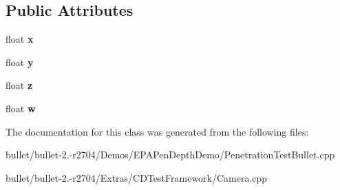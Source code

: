 \subsection*{Public Attributes}
\begin{DoxyCompactItemize}
\item 
\hypertarget{class_nx_quat_abeba7e7c847c8a81ffd26c622f9bd81d}{float {\bfseries x}}\label{class_nx_quat_abeba7e7c847c8a81ffd26c622f9bd81d}

\item 
\hypertarget{class_nx_quat_a6d8f570fe897c0316326cb920ca4c8f8}{float {\bfseries y}}\label{class_nx_quat_a6d8f570fe897c0316326cb920ca4c8f8}

\item 
\hypertarget{class_nx_quat_a3d9163d2ed0f4338a85f7f433acd044a}{float {\bfseries z}}\label{class_nx_quat_a3d9163d2ed0f4338a85f7f433acd044a}

\item 
\hypertarget{class_nx_quat_a038ff0300926b4a59481d97379538030}{float {\bfseries w}}\label{class_nx_quat_a038ff0300926b4a59481d97379538030}

\end{DoxyCompactItemize}


The documentation for this class was generated from the following files\+:\begin{DoxyCompactItemize}
\item 
bullet/bullet-\/2.-\/r2704/\+Demos/\+E\+P\+A\+Pen\+Depth\+Demo/Penetration\+Test\+Bullet.\+cpp\item 
bullet/bullet-\/2.-\/r2704/\+Extras/\+C\+D\+Test\+Framework/Camera.\+cpp\end{DoxyCompactItemize}
